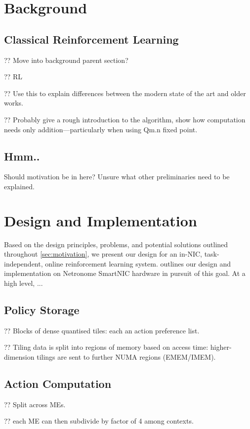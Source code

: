 \documentclass[sigconf,natbib=false]{acmart}
\begin{document}
\section{Background}

\subsection{Classical Reinforcement Learning}
?? Move into background parent section?

?? RL~\parencite{RL2E}

?? Use this to explain differences between the modern state of the art and older works.

?? Probably give a rough introduction to the algorithm, show how computation needs only addition---particularly when using Qm.n fixed point.

\subsection{Hmm..}
Should motivation be in here? Unsure what other preliminaries need to be explained.

\section{Design and Implementation}\label{sec:design}
Based on the design principles, problems, and potential solutions outlined throughout \cref{sec:motivation}, we present our design for an in-NIC, task-independent, online reinforcement learning system.
 outlines our design and implementation on Netronome SmartNIC hardware in pursuit of this goal.
At a high level, ...

\subsection{Policy Storage}
?? Blocks of dense quantised tiles: each an action preference list.

?? Tiling data is split into regions of memory based on access time: higher-dimension tilings are sent to further NUMA regions (EMEM/IMEM).

\subsection{Action Computation}
?? Split across MEs.

?? each ME can then subdivide by factor of 4 among contexts.
\end{document}

